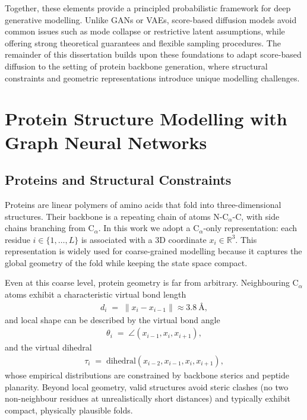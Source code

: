 \documentclass[a4paper,12pt]{article}
\begin{document}
Together, these elements provide a principled probabilistic framework for deep generative modelling. Unlike GANs or VAEs, score-based diffusion models avoid common issues such as mode collapse or restrictive latent assumptions, while offering strong theoretical guarantees and flexible sampling procedures. The remainder of this dissertation builds upon these foundations to adapt score-based diffusion to the setting of protein backbone generation, where structural constraints and geometric representations introduce unique modelling challenges.

\clearpage

\section{Protein Structure Modelling with Graph Neural Networks}\label{sec:protein-gnn}
\subsection{Proteins and Structural Constraints}\label{subsec:proteins-constraints}
Proteins are linear polymers of amino acids that fold into three-dimensional structures. Their backbone is a repeating chain of atoms N-C\(_\alpha\)-C, with side chains branching from C\(_\alpha\). In this work we adopt a C\(_\alpha\)-only representation: each residue \(i \in \{1,\dots,L\}\) is associated with a 3D coordinate \(x_i \in \mathbb{R}^3\). This representation is widely used for coarse-grained modelling because it captures the global geometry of the fold while keeping the state space compact.

Even at this coarse level, protein geometry is far from arbitrary. Neighbouring C\(_\alpha\) atoms exhibit a characteristic virtual bond length
\begin{align*}
    d_i \;=\; \|x_i - x_{i-1}\| \approx 3.8~\text{\AA},
\end{align*}
and local shape can be described by the virtual bond angle
\begin{align*}
    \theta_i \;=\; \angle(x_{i-1}, x_i, x_{i+1}),
\end{align*}
and the virtual dihedral
\begin{align*}
    \tau_i \;=\; \mathrm{dihedral}(x_{i-2}, x_{i-1}, x_i, x_{i+1}),
\end{align*}
whose empirical distributions are constrained by backbone sterics and peptide planarity. 
Beyond local geometry, valid structures avoid steric clashes (no two non-neighbour residues at unrealistically short distances) and typically exhibit compact, physically plausible folds. 
\end{document}

